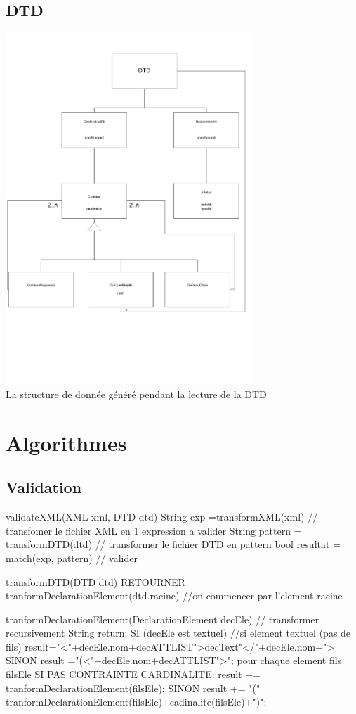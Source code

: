     \subsection{DTD}
        \includegraphics[width=0.7\textwidth]{img/ClassesDTD.pdf}\\
        La structure de donnée généré pendant la lecture de la DTD
        
\section{Algorithmes}

    \subsection{Validation}
	
	validateXML(XML xml, DTD dtd){
		String exp =transformXML(xml) // transfomer le fichier XML en 1 expression a valider
		String pattern = transformDTD(dtd) // transformer le fichier DTD en pattern 
		bool resultat = match(exp, pattern) // valider 		
	}

	transformDTD(DTD dtd){
		RETOURNER tranformDeclarationElement(dtd.racine) //on commencer par l'element racine
	}

	tranformDeclarationElement(DeclarationElement decEle) // transformer recursivement 
	{
		String return;
		SI (decEle est textuel) //si element textuel (pas de fils)
		{
			result="<"+decEle.nom+decATTLIST">decText"</"+decEle.nom+">
		}
		SINON
		{
			result ="(<"+decEle.nom+decATTLIST">";
			pour chaque element fils filsEle{
				SI PAS CONTRAINTE CARDINALITE:
					result += tranformDeclarationElement(filsEle);
				SINON
					result += "(" tranformDeclarationElement(filsEle)+cadinalite(filsEle)+")";
			}	
		}
	}

